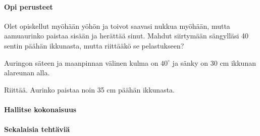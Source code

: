 \begin{tehtavasivu}

\paragraph*{Opi perusteet}

  \begin{tehtava}
    Olet opiskellut myöhään yöhön ja toivot saavasi nukkua myöhään, mutta aamuaurinko paistaa sisään ja herättää sinut. Mahdut siirtymään sängylläsi 40 sentin päähän ikkunasta, mutta riittääkö se pelastukseen?
    
    Auringon säteen ja maanpinnan välinen kulma on $40^\circ$ ja sänky on 30 cm ikkunan alareunan alla.
    \begin{vastaus}
    Riittää. Aurinko paistaa noin 35 cm päähän ikkunasta.
    \end{vastaus}
  \end{tehtava}

\paragraph*{Hallitse kokonaisuus}

\paragraph*{Sekalaisia tehtäviä}

\end{tehtavasivu}
